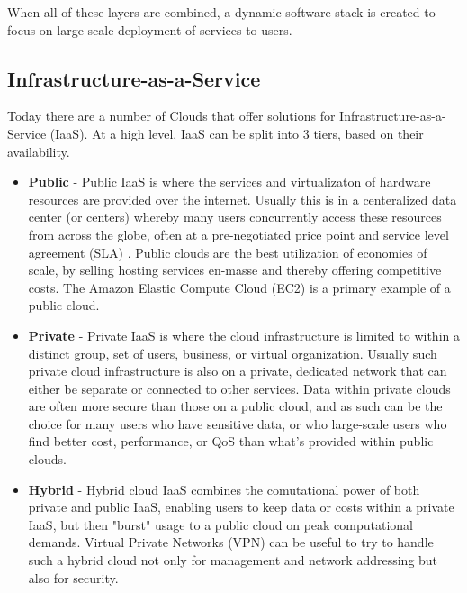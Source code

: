 When all of these layers are combined, a dynamic software stack is created to focus on large scale deployment of services to users.



\subsection{Infrastructure-as-a-Service}



Today there are a number of Clouds that offer solutions for Infrastructure-as-a-Service (IaaS). At a high level, IaaS can be split into 3 tiers, based on their availability.  

\begin{itemize}
\item \textbf{Public} - Public IaaS is where the services and virtualizaton of hardware resources are provided over the internet. Usually this is in a centeralized data center (or centers) whereby many users concurrently access these resources from across the globe, often at a pre-negotiated price point and service level agreement (SLA) \cite{baset2012cloud}.  Public clouds are the best utilization of economies of scale, by selling hosting services en-masse and thereby offering competitive costs. The Amazon Elastic Compute Cloud (EC2) is a primary example of a public cloud.    

\item \textbf{Private} - Private IaaS is where the cloud infrastructure is limited to within a distinct group, set of users, business, or virtual organization. Usually such private cloud infrastructure is also on a private, dedicated network that can either be separate or connected to other services. Data within private clouds are often more secure than those on a public cloud, and as such can be the choice for many users who have sensitive data, or who large-scale users who find better cost, performance, or QoS than what's provided  within public clouds.

\item \textbf{Hybrid} - Hybrid cloud IaaS combines the comutational power of both private and public IaaS, enabling users to keep data or costs within a private IaaS, but then "burst" usage to a public cloud on peak computational demands. Virtual Private Networks (VPN) can be useful to try to handle such a hybrid cloud not only for management and network addressing but also for security.  

\end{itemize}

